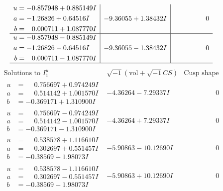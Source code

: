 \documentclass[1p]{elsarticle_modified}
\theoremstyle{definition}
\newcommand{\I}{\sqrt{-1}}
\begin{document}
$$\begin{array}{c|c|c}
\begin{aligned}
u &= -0.857948 + 0.885149 I \\
a &= -1.26826 + 0.64516 I \\
b &= \phantom{-}0.000711 + 1.087770 I\end{aligned}
 & -9.36055 + 1.38432 I & \phantom{-0.000000 } 0 \\ \hline\begin{aligned}
u &= -0.857948 - 0.885149 I \\
a &= -1.26826 - 0.64516 I \\
b &= \phantom{-}0.000711 - 1.087770 I\end{aligned}
 & -9.36055 - 1.38432 I & \phantom{-0.000000 } 0\\
 \hline 
 \end{array}$$\newpage$$\begin{array}{c|c|c}  
\text{Solutions to }I^u_{1}& \I (\text{vol} + \sqrt{-1}CS) & \text{Cusp shape}\\
 \hline 
\begin{aligned}
u &= \phantom{-}0.756697 + 0.974249 I \\
a &= \phantom{-}0.514142 + 1.001570 I \\
b &= -0.369171 + 1.310900 I\end{aligned}
 & -4.36264 - 7.29337 I & \phantom{-0.000000 } 0 \\ \hline\begin{aligned}
u &= \phantom{-}0.756697 - 0.974249 I \\
a &= \phantom{-}0.514142 - 1.001570 I \\
b &= -0.369171 - 1.310900 I\end{aligned}
 & -4.36264 + 7.29337 I & \phantom{-0.000000 } 0 \\ \hline\begin{aligned}
u &= \phantom{-}0.538578 + 1.116610 I \\
a &= \phantom{-}0.302697 + 0.551457 I \\
b &= -0.38569 + 1.98073 I\end{aligned}
 & -5.90863 - 10.12690 I & \phantom{-0.000000 } 0 \\ \hline\begin{aligned}
u &= \phantom{-}0.538578 - 1.116610 I \\
a &= \phantom{-}0.302697 - 0.551457 I \\
b &= -0.38569 - 1.98073 I\end{aligned}
 & -5.90863 + 10.12690 I & \phantom{-0.000000 } 0 \\ \hline\begin{aligned}

\end{aligned}
\end{array}$$
\end{document}

